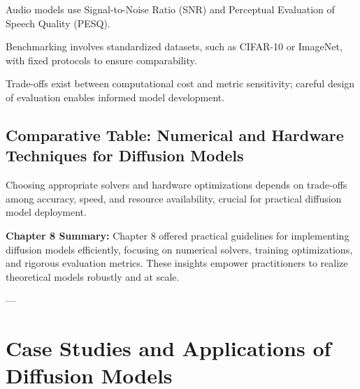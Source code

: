 \documentclass[a4paper,12pt,oneside]{memoir}
\begin{document}
Audio models use Signal-to-Noise Ratio (SNR) and Perceptual Evaluation of Speech Quality (PESQ).

Benchmarking involves standardized datasets, such as CIFAR-10 or ImageNet, with fixed protocols to ensure comparability.

Trade-offs exist between computational cost and metric sensitivity; careful design of evaluation enables informed model development.

\section{Comparative Table: Numerical and Hardware Techniques for Diffusion Models}

\begin{table}[h]
\centering
{}
\caption{Numerical and Hardware Optimization Techniques}
\end{table}

Choosing appropriate solvers and hardware optimizations depends on trade-offs among accuracy, speed, and resource availability, crucial for practical diffusion model deployment.

\textbf{Chapter 8 Summary:}  
Chapter 8 offered practical guidelines for implementing diffusion models efficiently, focusing on numerical solvers, training optimizations, and rigorous evaluation metrics. These insights empower practitioners to realize theoretical models robustly and at scale.

---

\chapter{Case Studies and Applications of Diffusion Models}
\end{document}
